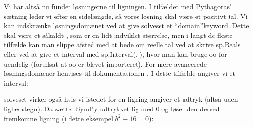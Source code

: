 \documentclass[letterpaper,10pt,english]{jupyterBook}
\begin{document}
\noindent{}

Vi har altså nu fundet løsningerne til ligningen. I tilfældet med Pythagoras’ sætning leder vi efter en sidelængde, så vores løsning skal være et positivt tal. Vi kan indskrænke løsningsdomænet ved at give solveset et “domain”\sphinxhyphen{}keyword. Dette skal være et såkaldt , som er en lidt indviklet størrelse, men i langt de fleste tilfælde kan man slippe afsted med at bede om reelle tal ved at skrive sp.Reals eller ved at give et interval med sp.Interval(, ), hvor man kan bruge oo for uendelig (forudsat at oo er blevet importeret). For mere avancerede løsningsdomæner henvises til dokumentationen . I dette tilfælde angiver vi et interval:

\begin{sphinxVerbatim}[commandchars=\\\{\}]
                
     
\end{sphinxVerbatim}

\noindent{}

solveset virker også hvis vi istedet for en ligning angiver et udtryk (altså uden lighedstegn). Da sætter SymPy udtrykket lig med 0 og løser den derved fremkomne ligning (i dette eksempel \(b^2-16 = 0\)):

\begin{sphinxVerbatim}[commandchars=\\\{\}]
       
\end{sphinxVerbatim}
\end{document}
